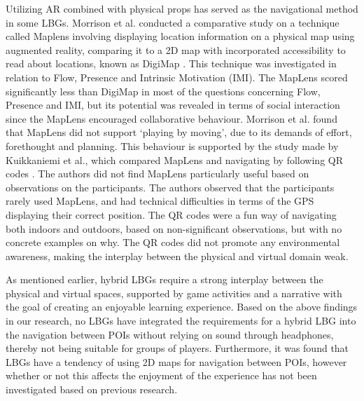 Utilizing AR combined with physical props has served as the navigational method in some LBGs. Morrison et al. conducted a comparative study on a technique called Maplens involving displaying location information on a physical map using augmented reality, comparing it to a 2D map with incorporated accessibility to read about locations, known as DigiMap \cite{Morrison}. This technique was investigated in relation to Flow, Presence and Intrinsic Motivation (IMI). The MapLens scored significantly less than DigiMap in most of the questions concerning Flow, Presence and IMI, but its potential was revealed in terms of social interaction since the MapLens encouraged collaborative behaviour.  Morrison et al. found that MapLens did not support ‘playing by moving’, due to its demands of effort, forethought and planning. This behaviour is supported by the study made by Kuikkaniemi et al., which compared MapLens and navigating by following QR codes \cite{LostLab}. The authors did not find MapLens particularly useful based on observations on the participants. The authors observed that the participants rarely used MapLens, and had technical difficulties in terms of the GPS displaying their correct position. The QR codes were a fun way of navigating both indoors and outdoors, based on non-significant observations, but with no concrete examples on why. The QR codes did not promote any environmental awareness, making the interplay between the physical and virtual domain weak. 

As mentioned earlier, hybrid LBGs require a strong interplay between the physical and virtual spaces, supported by game activities and a narrative with the goal of creating an enjoyable learning experience. Based on the above findings in our research, no LBGs have integrated the requirements for a hybrid LBG into the navigation between POIs without relying on sound through headphones, thereby not being suitable for groups of players. Furthermore, it was found that LBGs have a tendency of using 2D maps for navigation between POIs, however whether or not this affects the enjoyment of the experience has not been investigated based on previous research.


